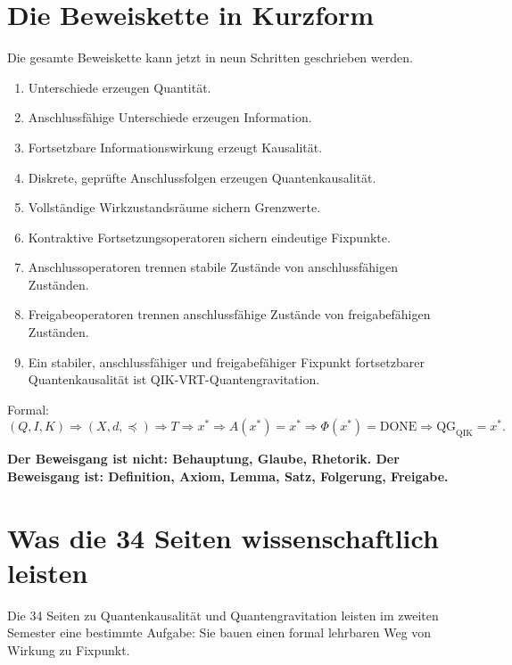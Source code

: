 \documentclass[11pt,a4paper,oneside]{scrartcl}
\theoremstyle{qikstyle}
\newcommand{\QIK}{\mathrm{QIK}}
\newcommand{\DONE}{\mathrm{DONE}}
\newcommand{\Phiop}{\Phi}
\newenvironment{merksatz}{\begin{center}\begin{minipage}{0.92\linewidth}\sffamily\bfseries}{\end{minipage}\end{center}}
\begin{document}
\section{Die Beweiskette in Kurzform}

Die gesamte Beweiskette kann jetzt in neun Schritten geschrieben werden.

\begin{enumerate}
\item Unterschiede erzeugen Quantität.
\item Anschlussfähige Unterschiede erzeugen Information.
\item Fortsetzbare Informationswirkung erzeugt Kausalität.
\item Diskrete, geprüfte Anschlussfolgen erzeugen Quantenkausalität.
\item Vollständige Wirkzustandsräume sichern Grenzwerte.
\item Kontraktive Fortsetzungsoperatoren sichern eindeutige Fixpunkte.
\item Anschlussoperatoren trennen stabile Zustände von anschlussfähigen Zuständen.
\item Freigabeoperatoren trennen anschlussfähige Zustände von freigabefähigen Zuständen.
\item Ein stabiler, anschlussfähiger und freigabefähiger Fixpunkt fortsetzbarer Quantenkausalität ist QIK-VRT-Quantengravitation.
\end{enumerate}

Formal:
\[
(Q,I,K) \Rightarrow (X,d,\preceq) \Rightarrow T \Rightarrow x^* \Rightarrow A(x^*)=x^* \Rightarrow \Phiop(x^*)=\DONE \Rightarrow \mathrm{QG}_{\QIK}=x^*.
\]

\begin{merksatz}
Der Beweisgang ist nicht: Behauptung, Glaube, Rhetorik. Der Beweisgang ist: Definition, Axiom, Lemma, Satz, Folgerung, Freigabe.
\end{merksatz}
\newpage

\section{Was die 34 Seiten wissenschaftlich leisten}

Die 34 Seiten zu Quantenkausalität und Quantengravitation leisten im zweiten Semester eine bestimmte Aufgabe: Sie bauen einen formal lehrbaren Weg von Wirkung zu Fixpunkt.
\end{document}
